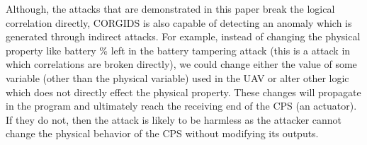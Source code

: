 Although, the attacks that are demonstrated in this paper break the logical correlation directly, CORGIDS is also capable of detecting an anomaly which is generated through indirect attacks. For example, instead of changing the physical property like battery \% left in the battery tampering attack (this is a attack in which correlations are broken directly), we could change either the value of some variable (other than the physical variable) used in the UAV or alter other logic which does not directly effect the physical property. These changes will propagate in the program and ultimately reach the receiving end of the CPS (an actuator). If they do not, then the attack is likely to be harmless as the attacker cannot change the physical behavior of the CPS without modifying its outputs. 

\endinput
=====================================================================
